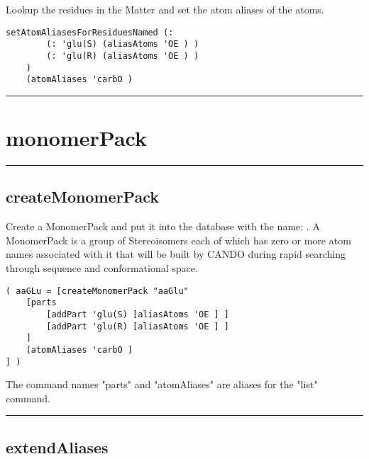 \begin{itemize}
Lookup the residues in the Matter and set the atom aliases of the atoms.


\begin{verbatim}
setAtomAliasesForResiduesNamed (:
        (: 'glu(S) (aliasAtoms 'OE ) )
        (: 'glu(R) (aliasAtoms 'OE ) )
    )
    (atomAliases 'carbO )
\end{verbatim}

\rule{6in}{0.01cm}\par
{}\par
\section{monomerPack}
\rule{6in}{0.01cm}\par
{}\par
\subsection{createMonomerPack}
\par
{}\par

Create a MonomerPack and put it into the database with the name: . A MonomerPack is a group of Stereoisomers each of which has zero or more atom names associated with it that will be built by CANDO during rapid searching through sequence and conformational space. 

\begin{verbatim}
( aaGLu = [createMonomerPack "aaGlu"
    [parts
        [addPart 'glu(S) [aliasAtoms 'OE ] ]
        [addPart 'glu(R) [aliasAtoms 'OE ] ]
    ]
    [atomAliases 'carbO ]
] )
\end{verbatim}

The command names "parts" and "atomAliases" are aliases for the "list" command.

\rule{6in}{0.01cm}\par
{}\par
\subsection{extendAliases}
\par


\end{itemize}
